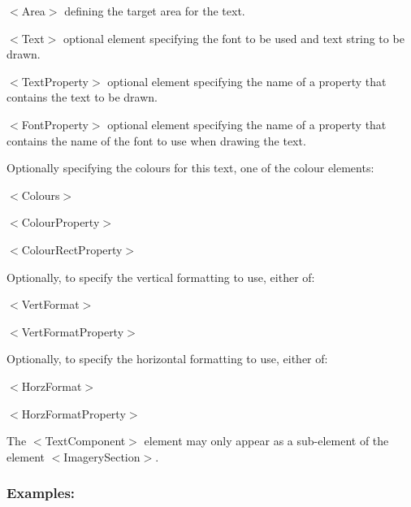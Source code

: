 \begin{DoxyItemize}
\item {\ttfamily $<$Area$>$} defining the target area for the text. 
\item {\ttfamily $<$Text$>$} optional element specifying the font to be used and text string to be drawn. 
\item {\ttfamily $<$Text\+Property$>$} optional element specifying the name of a property that contains the text to be drawn. 
\item {\ttfamily $<$Font\+Property$>$} optional element specifying the name of a property that contains the name of the font to use when drawing the text.


\item Optionally specifying the colours for this text, one of the colour elements\+: 
\begin{DoxyItemize}
\item {\ttfamily $<$Colours$>$} 
\item {\ttfamily $<$Colour\+Property$>$} 
\item {\ttfamily $<$Colour\+Rect\+Property$>$} 
\end{DoxyItemize}


\item Optionally, to specify the vertical formatting to use, either of\+: 
\begin{DoxyItemize}
\item {\ttfamily $<$Vert\+Format$>$} 
\item {\ttfamily $<$Vert\+Format\+Property$>$} 
\end{DoxyItemize}


\item Optionally, to specify the horizontal formatting to use, either of\+: 
\begin{DoxyItemize}
\item {\ttfamily $<$Horz\+Format$>$} 
\item {\ttfamily $<$Horz\+Format\+Property$>$} 
\end{DoxyItemize}


\item The {\ttfamily $<$Text\+Component$>$} element may only appear as a sub-\/element of the element {\ttfamily $<$Imagery\+Section$>$}. 
\end{DoxyItemize}\hypertarget{fal_element_ref_fal_elem_ref_sec_32_4}{}\subsubsection{Examples\+:}\label{fal_element_ref_fal_elem_ref_sec_32_4}
